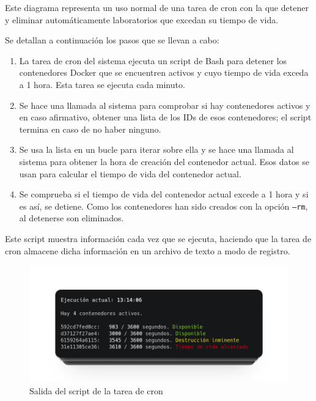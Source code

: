             Este diagrama representa un uso normal de una tarea de cron con la que detener y eliminar automáticamente laboratorios que excedan su tiempo de vida.

            Se detallan a continuación los pasos que se llevan a cabo:

            \begin{enumerate}
                \item La tarea de cron del sistema ejecuta un script de Bash para detener los contenedores Docker que se encuentren activos y cuyo tiempo de vida exceda a 1 hora. Esta tarea se ejecuta cada minuto.

                \item Se hace una llamada al sistema para comprobar si hay contenedores activos y en caso afirmativo, obtener una lista de los IDs de esos contenedores; el script termina en caso de no haber ninguno.

                \item Se usa la lista en un bucle para iterar sobre ella y se hace una llamada al sistema para obtener la hora de creación del contenedor actual. Esos datos se usan para calcular el tiempo de vida del contenedor actual.
                
                \item Se comprueba si el tiempo de vida del contenedor actual excede a 1 hora y si es así, se detiene. Como los contenedores han sido creados con la opción \texttt{--rm}, al detenerse son eliminados.
            \end{enumerate}

            Este script muestra información cada vez que se ejecuta, haciendo que la tarea de cron almacene dicha información en un archivo de texto a modo de registro.

            \begin{figure}[htbp]
                \centering

                \includegraphics[scale=0.3]{images/Capturas/cron-log.png}
                \caption{Salida del script de la tarea de cron}
                    \label{fig:detener-cron-log}
            \end{figure}

